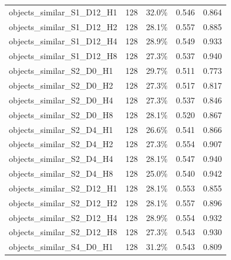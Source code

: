 \documentclass[11pt]{article}
\begin{document}
\begin{longtable}{p{}rrrr}
objects\_\allowbreak{}similar\_\allowbreak{}S1\_\allowbreak{}D12\_\allowbreak{}H1 & 128 & 32.0\% & 0.546 & 0.864\\
objects\_\allowbreak{}similar\_\allowbreak{}S1\_\allowbreak{}D12\_\allowbreak{}H2 & 128 & 28.1\% & 0.557 & 0.885\\
objects\_\allowbreak{}similar\_\allowbreak{}S1\_\allowbreak{}D12\_\allowbreak{}H4 & 128 & 28.9\% & 0.549 & 0.933\\
objects\_\allowbreak{}similar\_\allowbreak{}S1\_\allowbreak{}D12\_\allowbreak{}H8 & 128 & 27.3\% & 0.537 & 0.940\\
objects\_\allowbreak{}similar\_\allowbreak{}S2\_\allowbreak{}D0\_\allowbreak{}H1 & 128 & 29.7\% & 0.511 & 0.773\\
objects\_\allowbreak{}similar\_\allowbreak{}S2\_\allowbreak{}D0\_\allowbreak{}H2 & 128 & 27.3\% & 0.517 & 0.817\\
objects\_\allowbreak{}similar\_\allowbreak{}S2\_\allowbreak{}D0\_\allowbreak{}H4 & 128 & 27.3\% & 0.537 & 0.846\\
objects\_\allowbreak{}similar\_\allowbreak{}S2\_\allowbreak{}D0\_\allowbreak{}H8 & 128 & 28.1\% & 0.520 & 0.867\\
objects\_\allowbreak{}similar\_\allowbreak{}S2\_\allowbreak{}D4\_\allowbreak{}H1 & 128 & 26.6\% & 0.541 & 0.866\\
objects\_\allowbreak{}similar\_\allowbreak{}S2\_\allowbreak{}D4\_\allowbreak{}H2 & 128 & 27.3\% & 0.554 & 0.907\\
objects\_\allowbreak{}similar\_\allowbreak{}S2\_\allowbreak{}D4\_\allowbreak{}H4 & 128 & 28.1\% & 0.547 & 0.940\\
objects\_\allowbreak{}similar\_\allowbreak{}S2\_\allowbreak{}D4\_\allowbreak{}H8 & 128 & 25.0\% & 0.540 & 0.942\\
objects\_\allowbreak{}similar\_\allowbreak{}S2\_\allowbreak{}D12\_\allowbreak{}H1 & 128 & 28.1\% & 0.553 & 0.855\\
objects\_\allowbreak{}similar\_\allowbreak{}S2\_\allowbreak{}D12\_\allowbreak{}H2 & 128 & 28.1\% & 0.557 & 0.896\\
objects\_\allowbreak{}similar\_\allowbreak{}S2\_\allowbreak{}D12\_\allowbreak{}H4 & 128 & 28.9\% & 0.554 & 0.932\\
objects\_\allowbreak{}similar\_\allowbreak{}S2\_\allowbreak{}D12\_\allowbreak{}H8 & 128 & 27.3\% & 0.543 & 0.930\\
objects\_\allowbreak{}similar\_\allowbreak{}S4\_\allowbreak{}D0\_\allowbreak{}H1 & 128 & 31.2\% & 0.543 & 0.809\\

\end{longtable}
\end{document}
